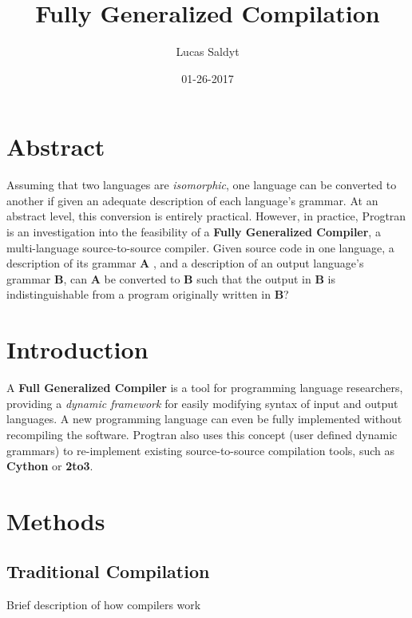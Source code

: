 \documentclass{article}
\title{Fully Generalized Compilation}
\date{01-26-2017}
\author{Lucas Saldyt}
\begin{document}
\maketitle
{}
\newpage
{}

\section{Abstract}

Assuming that two languages are \textit{isomorphic}, one language can be converted to another if given an adequate description of each language's grammar.
At an abstract level, this conversion is entirely practical. However, in practice,  
Progtran is an investigation into the feasibility of a \textbf{Fully Generalized Compiler}, a multi-language source-to-source compiler. 
Given source code in one language, a description of its grammar \textbf{A} , and a description of an output language's grammar \textbf{B}, can \textbf{A} be converted to \textbf{B} such that the output in \textbf{B} is indistinguishable from a program originally written in \textbf{B}?

\section{Introduction}

A \textbf{Full Generalized Compiler} is a tool for programming language researchers, providing a \textit{dynamic framework} for easily modifying syntax of input and output languages. 
A new programming language can even be fully implemented without recompiling the software. 
Progtran also uses this concept (user defined dynamic grammars) to re-implement existing source-to-source compilation tools, such as \textbf{Cython} or \textbf{2to3}.

\section{Methods}

\subsection{Traditional Compilation}
Brief description of how compilers work
\end{document}
